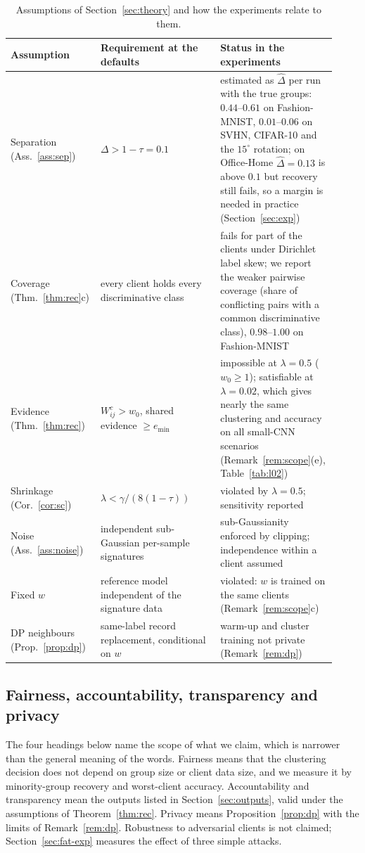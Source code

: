\documentclass[pdflatex,sn-apa]{sn-jnl}
\theoremstyle{thmstyleone}
\theoremstyle{thmstylethree}
\begin{document}
\begin{table}[!htbp]
\centering
\caption{Assumptions of Section~\ref{sec:theory} and how the experiments relate to them.}\label{tab:assumptions}
\small
\begin{tabular}{p{0.21\linewidth}p{0.36\linewidth}p{0.35\linewidth}}
\toprule
Assumption & Requirement at the defaults & Status in the experiments \\
\midrule
Separation (Ass.~\ref{ass:sep}) & $\Delta>1-\tau=0.1$ & estimated as $\hat\Delta$ per run with the true groups: $0.44$--$0.61$ on Fashion-MNIST, $0.01$--$0.06$ on SVHN, CIFAR-10 and the $15^\circ$ rotation; on Office-Home $\hat\Delta=0.13$ is above $0.1$ but recovery still fails, so a margin is needed in practice (Section~\ref{sec:exp}) \\
Coverage (Thm.~\ref{thm:rec}c) & every client holds every discriminative class & fails for part of the clients under Dirichlet label skew; we report the weaker pairwise coverage (share of conflicting pairs with a common discriminative class), $0.98$--$1.00$ on Fashion-MNIST \\
Evidence (Thm.~\ref{thm:rec}) & $W^c_{ij}>w_0$, shared evidence $\ge e_{\min}$ & impossible at $\lambda=0.5$ ($w_0\ge1$); satisfiable at $\lambda=0.02$, which gives nearly the same clustering and accuracy on all small-CNN scenarios (Remark~\ref{rem:scope}(e), Table~\ref{tab:l02}) \\
Shrinkage (Cor.~\ref{cor:sc}) & $\lambda<\gamma/(8(1-\tau))$ & violated by $\lambda=0.5$; sensitivity reported \\
Noise (Ass.~\ref{ass:noise}) & independent sub-Gaussian per-sample signatures & sub-Gaussianity enforced by clipping; independence within a client assumed \\
Fixed $w$ & reference model independent of the signature data & violated: $w$ is trained on the same clients (Remark~\ref{rem:scope}c) \\
DP neighbours (Prop.~\ref{prop:dp}) & same-label record replacement, conditional on $w$ & warm-up and cluster training not private (Remark~\ref{rem:dp}) \\
\bottomrule
\end{tabular}
\end{table}

\subsection{Fairness, accountability, transparency and privacy}\label{sec:fat}
The four headings below name the scope of what we claim, which is narrower than the general meaning of the words. Fairness means that the clustering decision does not depend on group size or client data size, and we measure it by minority-group recovery and worst-client accuracy. Accountability and transparency mean the outputs listed in Section~\ref{sec:outputs}, valid under the assumptions of Theorem~\ref{thm:rec}. Privacy means Proposition~\ref{prop:dp} with the limits of Remark~\ref{rem:dp}. Robustness to adversarial clients is not claimed; Section~\ref{sec:fat-exp} measures the effect of three simple attacks.
\end{document}

